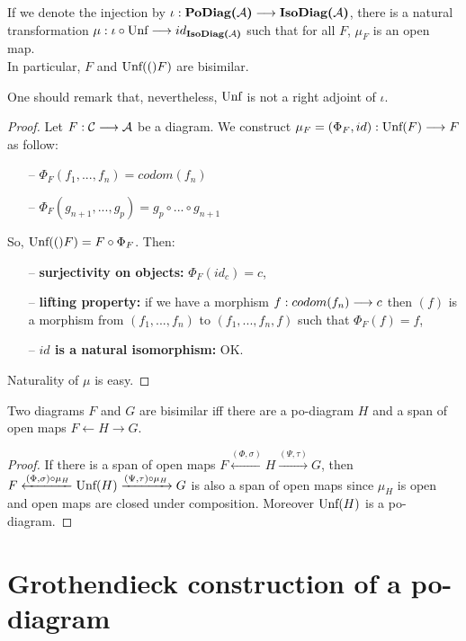 \begin{prop} If we denote the injection by $\iota : \textbf{PoDiag(}\mathcal{A}\textbf{)} \longrightarrow \textbf{IsoDiag(}\mathcal{A}\textbf{)}$, there is a natural transformation $\mu : \iota\circ \text{Unf} \longrightarrow id_{\textbf{IsoDiag(}\mathcal{A}\textbf{)}}$ such that for all $F$, $\mu_F$ is an open map.\\
In particular, $F$ and $\text{Unf}(()F)$ are bisimilar.
\end{prop}

One should remark that, nevertheless, $\text{Unf}$ is not a right adjoint of $\iota$.

\begin{proof}
Let $F : \mathcal{C} \longrightarrow \mathcal{A}$ be a diagram. We construct $\mu_F = (\Phi_F,id) : \text{Unf}(F) \longrightarrow F$ as follow:
		\begin{itemize}
			\item[--] $\Phi_F(f_1,...,f_n) = codom(f_n)$
			\item[--] $\Phi_F(g_{n+1},...,g_p) = g_p \circ ... \circ g_{n+1}$
		\end{itemize}
		So, $\text{Unf}(()F) = F \circ \Phi_F$. Then:
		\begin{itemize}
			\item[--] \textbf{surjectivity on objects:} $\Phi_F(id_c) = c$,
			\item[--] \textbf{lifting property:} if we have a morphism $f : codom(f_n) \longrightarrow c$ then $(f)$ is a morphism from $(f_1,...,f_n)$ to $(f_1,...,f_n,f)$ such that $\Phi_F(f) = f$,
			\item[--] \textbf{$id$ is a natural isomorphism:} OK.
		\end{itemize}
		Naturality of $\mu$ is easy.
\end{proof}

\begin{coro}
Two diagrams $F$ and $G$ are bisimilar iff there are a po-diagram $H$ and a span of open maps $F \longleftarrow H \longrightarrow G$.
\end{coro}

\begin{proof}
If there is a span of open maps $F \xleftarrow{(\Phi,\sigma)} H \xrightarrow{(\Psi,\tau)} G$, then $F \xleftarrow{(\Phi,\sigma)\circ\mu_H} \text{Unf}(H) \xrightarrow{(\Psi,\tau)\circ\mu_H} G$ is also a span of open maps since $\mu_H$ is open and open maps are closed under composition. Moreover $\text{Unf}(H)$ is a po-diagram.
\end{proof}




\section{Grothendieck construction of a po-diagram}
	
